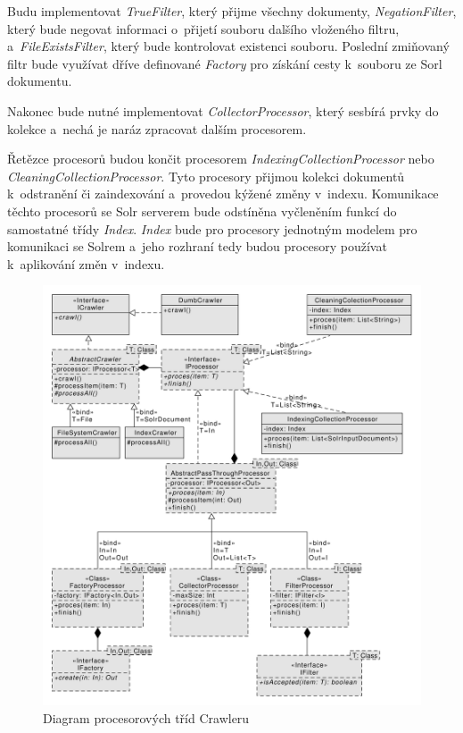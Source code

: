Budu implementovat \emph{TrueFilter}, který přijme všechny dokumenty, \emph{NegationFilter}, který bude negovat informaci o~přijetí souboru dalšího vloženého filtru, a~\emph{FileExistsFilter}, který bude kontrolovat existenci souboru. Poslední zmiňovaný filtr bude využívat dříve definované \emph{Factory} pro získání cesty k~souboru ze Sorl dokumentu.

Nakonec bude nutné implementovat \emph{CollectorProcessor}, který sesbírá prvky do kolekce a~nechá je naráz zpracovat dalším procesorem.

Řetězce procesorů budou končit procesorem \emph{IndexingCollectionProcessor} nebo \emph{CleaningCollectionProcessor}. Tyto procesory přijmou kolekci dokumentů k~odstranění či zaindexování a~provedou kýžené změny v~indexu. Komunikace těchto procesorů se Solr serverem bude odstíněna vyčleněním funkcí do samostatné třídy \emph{Index}. \emph{Index} bude pro procesory jednotným modelem pro komunikaci se Solrem a~jeho rozhraní tedy budou procesory používat k~aplikování změn v~indexu.

\begin{figure}[h]
\begin{center}
\includegraphics[width=13cm]{ProcessorClasses}
\caption{Diagram procesorových tříd Crawleru}
\label{fig:ProcessorClasses}
\end{center}
\end{figure}

